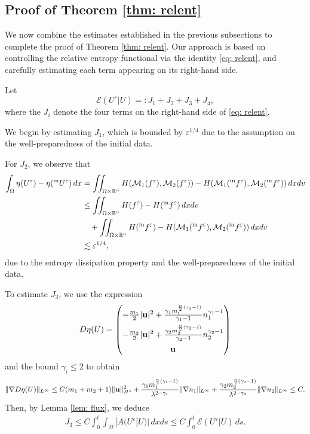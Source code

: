 \documentclass[10pt,reqno]{amsart}
\numberwithin{equation}{section}
\newcommand{\R}{\mathbb R}
\newcommand{\calM}{\mathcal M}
\newcommand{\calE}{\mathcal E}
\newcommand{\ve}{\varepsilon}
\begin{document}
%
%
%
%
%
%
%
%



\subsection{Proof of Theorem \ref{thm: relent}}
We now combine the estimates established in the previous subsections to complete the proof of Theorem \ref{thm: relent}. Our approach is based on controlling the relative entropy functional via the identity \eqref{eq: relent}, and carefully estimating each term appearing on its right-hand side.
 
Let 
\[
\calE(U^\ve|U) =: J_1 + J_2 + J_3 + J_4, 
\]
where the $J_i$ denote the four terms on the right-hand side of \eqref{eq: relent}.

We begin by estimating $J_1$, which is bounded by $\ve^{1/4}$ due to the assumption on the well-preparedness of the initial data.

For $J_2$, we observe that
\begin{align*}
    \int_\Omega \eta(U^\ve) - \eta({}^{\rm in}U^\ve)\,dx &= \iint_{\Omega \times \R^n} H(\calM_1(f^\ve),\calM_2(f^\ve)) - H(\calM_1({}^{\rm in}f^\ve),\calM_2({}^{\rm in}f^\ve))\,dxdv \\
    &\le \iint_{\Omega \times \R^n} H(f^\ve) - H({}^{\rm in}f^\ve) \,dxdv \\
    &\quad + \iint_{\Omega \times \R^n} H({}^{\rm in}f^\ve) - H(\calM_1({}^{\rm in}f^\ve),\calM_2({}^{\rm in}f^\ve))\,dxdv \\
    &\lesssim \ve^{1/4},
\end{align*}
due to the entropy dissipation property and the well-preparedness of the initial data.

To estimate $J_3$, we use the expression
    \begin{align*}
        D\eta(U) = \begin{pmatrix}
            -\frac{m_1}{2}|{\bf{u}}|^2 + \frac{\gamma_1 m_1^{\frac{n}{2}(\gamma_1 - 1)}}{\gamma_1 - 1}n_1^{\gamma_1-1} \\[2mm]
            -\frac{m_2}{2}|{\bf{u}}|^2 + \frac{\gamma_2 m_2^{\frac{n}{2}(\gamma_2 - 1)}}{\gamma_2 - 1} n_2^{\gamma_2 - 1}\\[2mm]
            {\bf{u}}
        \end{pmatrix}
    \end{align*}
and the bound $\gamma_i \le 2$ to obtain 
    \begin{align*}
        \|\nabla D\eta(U)\|_{L^\infty} \le C(m_1+m_2 + 1)\|{\bf{u}}\|_{H^s}^2 + \frac{\gamma_1 m_1^{\frac{n}{2}(\gamma_1 - 1)}}{\lambda^{2-\gamma_1}} \|\nabla n_1\|_{L^\infty} + \frac{\gamma_2 m_2^{\frac{n}{2}(\gamma_2 - 1)}}{\lambda^{2-\gamma_2}} \|\nabla n_2\|_{L^\infty} \le C.
    \end{align*}
Then, by Lemma \ref{lem: flux}, we deduce
    \begin{align*}
        J_3 \le C \int_0^t \int_\Omega |A(U^\ve|U)|\,dx ds \le C\int_0^t \calE(U^\ve|U)\, ds.
    \end{align*}
    
\end{document}
